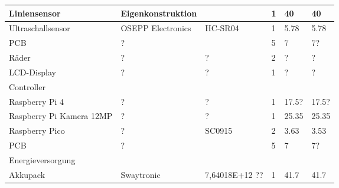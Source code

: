 \documentclass[main.tex]{subfiles} %
\begin{document}
\begin{table}[h]
\begin{tabular}{|p{3cm}|p{3cm}|p{3cm}|p{1cm}|p{1.5cm}|p{1cm}|}
        Liniensensor                           & Eigenkonstruktion   &                         & 1               & 40                        & 40                          \\ \hline
        Ultraschallsensor                      & OSEPP Electronics   & HC-SR04                 & 1               & 5.78                      & 5.78                        \\ \hline
        PCB                                    & ?                   &                         & 5               & 7                         & 7?                          \\ \hline
        Räder                                  & ?                   & ?                       & 2               & ?                         & ?                           \\ \hline
        LCD-Display                            & ?                   & ?                       & 1               & ?                         & ?                           \\ \hline
        \rowcolor{lightgray} Controller        &                     &                         &                 &                           &                             \\ \hline
        Raspberry Pi 4                         & ?                   & ?                       & 1               & 17.5?                     & 17.5?                       \\ \hline
        Raspberry Pi Kamera 12MP               & ?                   & ?                       & 1               & 25.35                     & 25.35                       \\ \hline
        Raspberry Pico                         & ?                   & SC0915                  & 2               & 3.63                      & 3.53                        \\ \hline
        PCB                                    & ?                   &                         & 5               & 7                         & 7?                          \\ \hline
        \rowcolor{lightgray} Energieversorgung &                     &                         &                 &                           &                             \\ \hline
        Akkupack                               & Swaytronic          & 7,64018E+12 ??          & 1               & 41.7                      & 41.7                        \\ \hline

\end{tabular}
\end{table}
\end{document}
